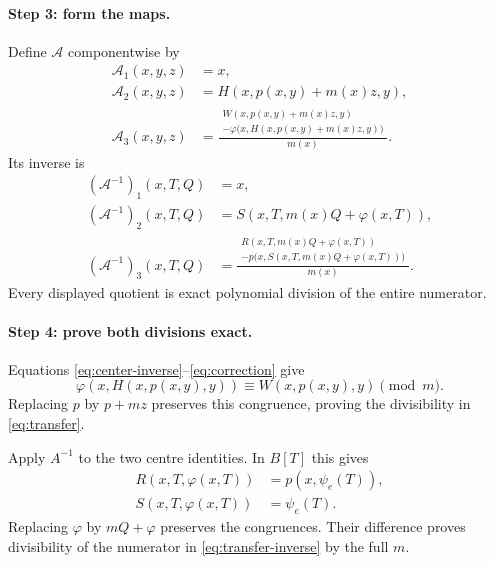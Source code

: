 \documentclass[11pt,a4paper]{article}
\begin{document}
\paragraph{Step 3: form the maps.}
Define $\mathcal A$ componentwise by
\begin{equation}\label{eq:transfer}
\begin{aligned}
\mathcal A_1(x,y,z)&=x,\\
\mathcal A_2(x,y,z)&=H(x,p(x,y)+m(x)z,y),\\
\mathcal A_3(x,y,z)&=
\frac{\begin{gathered}
W(x,p(x,y)+m(x)z,y)\\[-2pt]
-\varphi\bigl(x,H(x,p(x,y)+m(x)z,y)\bigr)
\end{gathered}}{m(x)}.
\end{aligned}
\end{equation}
Its inverse is
\begin{equation}\label{eq:transfer-inverse}
\begin{aligned}
(\mathcal A^{-1})_1(x,T,Q)&=x,\\
(\mathcal A^{-1})_2(x,T,Q)&=S(x,T,m(x)Q+\varphi(x,T)),\\
(\mathcal A^{-1})_3(x,T,Q)&=
\frac{\begin{gathered}
R(x,T,m(x)Q+\varphi(x,T))\\[-2pt]
-p\bigl(x,S(x,T,m(x)Q+\varphi(x,T))\bigr)
\end{gathered}}{m(x)}.
\end{aligned}
\end{equation}
Every displayed quotient is exact polynomial division of the entire numerator.

\paragraph{Step 4: prove both divisions exact.}
Equations \eqref{eq:center-inverse}--\eqref{eq:correction} give
\[
\varphi(x,H(x,p(x,y),y))\equiv W(x,p(x,y),y)\pmod m.
\]
Replacing $p$ by $p+mz$ preserves this congruence, proving the divisibility
in \eqref{eq:transfer}.

Apply $A^{-1}$ to the two centre identities. In $B[T]$ this gives
\[
\begin{aligned}
R(x,T,\varphi(x,T))&=p(x,\psi_e(T)),\\
S(x,T,\varphi(x,T))&=\psi_e(T).
\end{aligned}
\]
Replacing $\varphi$ by $mQ+\varphi$ preserves the congruences. Their
difference proves divisibility of the numerator in
\eqref{eq:transfer-inverse} by the full $m$.
\end{document}
